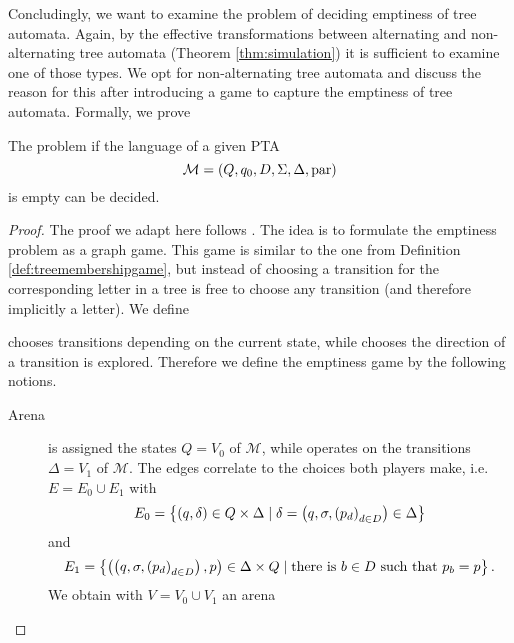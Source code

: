Concludingly, we want to examine the problem of deciding emptiness of tree 
automata. Again, by the effective transformations between alternating and 
non-alternating tree automata (Theorem \ref{thm:simulation}) it is sufficient 
to examine one of those types. We opt for non-alternating tree automata and 
discuss the reason for this after introducing a game to capture the emptiness
of tree automata. Formally, we prove
\begin{theorem}
  \cite[Theorem 21]{AutoInfObj}
  The problem if the language of a given \ac{PTA}
  \begin{equation*}
    \mathcal{M} = \left(Q, q_{0}, D, \Sigma, \Delta, \operatorname{par}\right)
  \end{equation*}
  is empty can be decided.
\end{theorem}
\begin{proof}
  The proof we adapt here follows 
  \cite[Proof of Theorem 23]{ParityGamesPosDet}. The idea is to formulate the
  emptiness problem as a graph game. This game is similar to the one from
  Definition \ref{def:treemembershipgame}, but instead of choosing a transition
  for the corresponding letter in a tree \automaton{} is free to choose any
  transition (and therefore implicitly a letter). We define
  \begin{definition}
    \automaton{} chooses transitions depending on the current state, while
    \pathfinder{} chooses the direction of a transition is explored. Therefore
    we define the emptiness game by the following notions.
    \begin{description}
      \item [Arena] \automaton{} is assigned the states $Q = V_{0} $ of 
        $\mathcal{M}$, while \pathfinder{} operates on the transitions 
        $\Delta = V_{1}$ of $\mathcal{M}$. The edges correlate to the choices
        both players make, i.e. $E = E_{0}\cup E_{1}$ with
        \begin{equation*}
          E_{0} = \left\{\left(q, \delta\right)\in Q\times\Delta\mid\delta = 
            \left(q, \sigma, \left(p_{d}\right)_{d\in D}\right)\in\Delta\right\}
        \end{equation*}
        and
        \begin{equation*}
          E_{1} = \left\{\left(\left(q, \sigma, \left(p_{d}\right)_{d\in D}\right), p\right)
            \in\Delta\times Q\mid\text{there is }b\in D
            \text{ such that }p_{b} = p
          \right\}.
        \end{equation*}
        We obtain with $V = V_{0}\cup V_{1}$ an arena 

\end{description}
\end{definition}
\end{proof}
